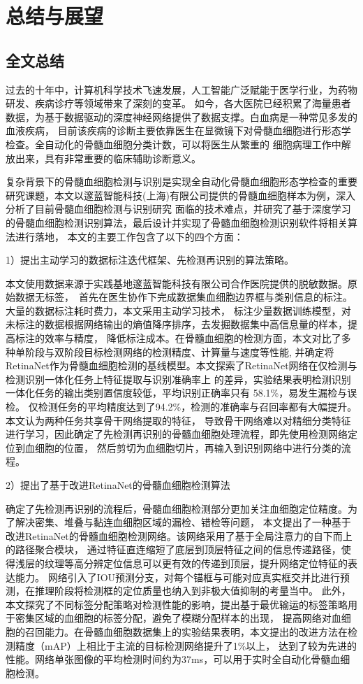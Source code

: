\chapter{总结与展望}
\section{全文总结}
过去的十年中，计算机科学技术飞速发展，人工智能广泛赋能于医学行业，为药物研发、疾病诊疗等领域带来了深刻的变革。
如今，各大医院已经积累了海量患者数据，为基于数据驱动的深度神经网络提供了数据支撑。白血病是一种常见多发的血液疾病，
目前该疾病的诊断主要依靠医生在显微镜下对骨髓血细胞进行形态学检查。全自动化的骨髓血细胞分类计数，可以将医生从繁重的
细胞病理工作中解放出来，具有非常重要的临床辅助诊断意义。

复杂背景下的骨髓血细胞检测与识别是实现全自动化骨髓血细胞形态学检查的重要研究课题，本文以邃蓝智能科技(上海)有限公司提供的骨髓血细胞样本为例，深入分析了目前骨髓血细胞检测与识别研究
面临的技术难点，并研究了基于深度学习的骨髓血细胞检测识别算法，最后设计并实现了骨髓血细胞检测识别软件将相关算法进行落地，
本文的主要工作包含了以下的四个方面：

1）提出主动学习的数据标注迭代框架、先检测再识别的算法策略。

本文使用数据来源于实践基地邃蓝智能科技有限公司合作医院提供的脱敏数据。原始数据无标签，\
首先在医生协作下完成数据集血细胞边界框与类别信息的标注。大量的数据标注耗时费力，本文采用主动学习技术，
标注少量数据训练模型，对未标注的数据根据网络输出的熵值降序排序，去发掘数据集中高信息量的样本，提高标注的效率与精度，
降低标注成本。在骨髓血细胞的检测方面，本文对比了多种单阶段与双阶段目标检测网络的检测精度、计算量与速度等性能,
并确定将RetinaNet作为骨髓血细胞检测的基线模型。本文探索了RetinaNet网络在仅检测与检测识别一体化任务上特征提取与识别准确率上
的差异，实验结果表明检测识别一体化任务的输出类别置信度较低，平均识别正确率只有 58.1\%，易发生漏检与误检。
仅检测任务的平均精度达到了94.2\%，检测的准确率与召回率都有大幅提升。本文认为两种任务共享骨干网络提取的特征，
导致骨干网络难以对精细分类特征进行学习，因此确定了先检测再识别的骨髓血细胞处理流程，即先使用检测网络定位到血细胞的位置，
然后剪切为血细胞切片，再输入到识别网络中进行分类的流程。

2）提出了基于改进RetinaNet的骨髓血细胞检测算法

确定了先检测再识别的流程后，骨髓血细胞检测部分更加关注血细胞定位精度。为了解决密集、堆叠与黏连血细胞区域的漏检、错检等问题，
本文提出了一种基于改进RetinaNet的骨髓血细胞检测网络。该网络采用了基于全局注意力的自下而上的路径聚合模块，
通过特征直连缩短了底层到顶层特征之间的信息传递路径，使得浅层的纹理等高分辨定位信息可以更有效的传递到顶层，提升网络定位特征的表达能力。
网络引入了IOU预测分支，对每个锚框与可能对应真实框交并比进行预测，在推理阶段将检测框的定位质量也纳入到非极大值抑制的考量当中。
此外，本文探究了不同标签分配策略对检测性能的影响，提出基于最优输运的标签策略用于密集区域的血细胞的标签分配，避免了模糊分配样本的出现，
提高网络对血细胞的召回能力。在骨髓血细胞数据集上的实验结果表明，本文提出的改进方法在检测精度（mAP）上相比于主流的目标检测网络提升了1\%以上，
达到了较为先进的性能。网络单张图像的平均检测时间约为37ms，可以用于实时全自动化骨髓血细胞检测。

